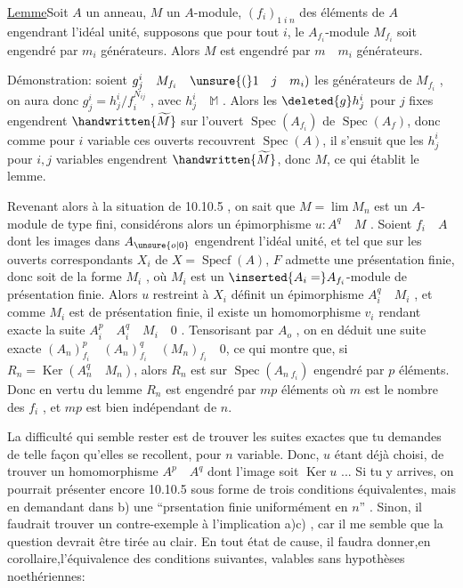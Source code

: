 \uline{Lemme}\quad Soit $A$ un anneau, $M$ un $A$-module, $(f_i)_{1\;i\;n}$ des éléments de $A$ engendrant l'idéal unité,  supposons que pour tout $i$, le $A_{f_i}$-module $M_{f_i}$ soit engendré par $m_i$ générateurs. Alors $M$ est engendré par $m\quad m_i$ générateurs.

Démonstration: soient $g_j^i\quad M_{f_i}\quad\unsure{(}1\quad j\quad m_i)$ les générateurs de $M_{f_i}$ , on aura donc $g_j^i=h_j^i/f_i^{N_{ij}}$ , avec $h_j^i\quad\mathbb{M}$ . Alors les $\deleted{g}h_j^i$ pour $j$ fixes engendrent $\handwritten{\widetilde{M}}$ sur l'ouvert $\operatorname{Spec}(A_{f_i})$ de $\operatorname{Spec}(A_f)$, donc comme pour $i$ variable ces ouverts recouvrent $\operatorname{Spec}(A)$, il s'ensuit que les $h_j^i$ pour $i,j$ variables engendrent $\handwritten{\widetilde{M}}$, donc $M$, ce qui établit le lemme.

Revenant alors à la situation de 10.10.5 , on sait que $M=\lim M_n$ est un $A$-module de type fini, considérons alors un épimorphisme $u:A^q\quad M$ . Soient $f_i\quad A$ dont les images dans $A_{\unsure{o|0}}$ engendrent l'idéal unité, et tel que sur les  ouverts correspondants $X_i$ de $X=\operatorname{Specf}(A)$, $F$ admette une présentation finie, donc soit de la forme $M_i$ , où $M_i$ est un $\inserted{A_i=}A_{f_i}$-module de présentation finie. Alors $u$ restreint à $X_i$ définit un épimorphisme $A_i^q\quad M_i$ , et comme $M_i$ est de présentation finie, il existe un homomorphisme $v_i$ rendant exacte la suite $A_i^p\quad A_i^q\quad M_i\quad0$ . Tensorisant par $A_o$ , on en déduit une suite exacte $(A_n)_{f_i}^p\quad(A_n)_{f_i}^q\quad(M_n)_{f_i}\quad0$, ce qui montre que, si $R_n=\operatorname{Ker}(A_n^q\quad M_n)$, alors $R_n$ est sur $\operatorname{Spec}(A_{n\;f_i})$ engendré par $p$ éléments. Donc en vertu du lemme $R_n$ est engendré par $mp$ éléments
où $m$ est le nombre des $f_i$ , et $mp$ est bien indépendant de $n$.

La difficulté qui  semble rester est de trouver les suites exactes que tu demandes de telle façon qu'elles se recollent, pour $n$ variable. Donc, $u$ étant déjà choisi, de trouver un homomorphisme $A^p\quad A^q$  dont l'image soit $\operatorname{Ker}u$ ... Si tu y arrives, on pourrait présenter encore 10.10.5 sous forme de trois conditions équivalentes, mais en demandant dans b) une ``prsentation finie uniformément en $n$'' . Sinon, il faudrait trouver un contre-exemple à  l'implication a)\quad c) , car il me semble que la question devrait être tirée au clair. En tout état de cause, il faudra donner,en corollaire,l'équivalence des conditions suivantes, valables sans hypothèses noethériennes:


